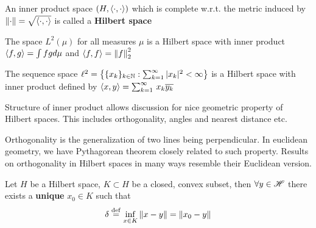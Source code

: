 \documentclass{article}
\begin{document}
\begin{definition}
    An inner product space $(H, \left<{\cdot},{\cdot}\right>)$ which is complete w.r.t. the metric induced by $\left\|{\cdot}\right\|=\sqrt{\left<{\cdot},{\cdot}\right>}$ is called a \textbf{Hilbert space}
\end{definition}

\begin{example}[$L^2-$spaces]
The space $L^2(\mu)$ for all measures $\mu$ is a Hilbert space with inner product $\left<{f},{g}\right>=\int fg d\mu$ and $\left<{f},{f}\right>=\left\|{f}\right\|_2^2$    
\end{example}

\begin{example}[$l^2-$spaces]
The sequence space
	$\ell^2=
		\left\{\{x_k\}_{k\in \mathbb{N}}:\sum_{k=1}^\infty |x_k|^2<\infty \right\}$
	is a Hilbert space with inner product defined by 
	$
		\left<{x},{y}\right>=\sum_{k=1}^\infty \,{x_k \overline{y_k}}
	$
\end{example}

\begin{unexaminable}
Structure of inner product allows discussion for nice geometric property of Hilbert spaces. This includes orthogonality, angles and nearest distance etc.
\end{unexaminable}
\begin{unexaminable}
Orthogonality is the generalization of two lines being perpendicular. In euclidean geometry, we have Pythagorean theorem closely related to such property. Results on orthogonality in Hilbert spaces in many ways resemble their Euclidean version.
\end{unexaminable}

\begin{theorem}
\nextline
\label{nearest point}
	Let $H$ be a Hilbert space, $K\subset H$ be a closed, convex subset, then $\forall y \in \mathscr{H}$ there exists a {\bf{unique}} $x_0\in K$ such that
	$$
		\delta \overset{\rm{def}}{=} \inf_{x\in K} \left\|{x-y}\right\| = \left\|{x_0-y}\right\|
	$$
\end{theorem}
\end{document}
